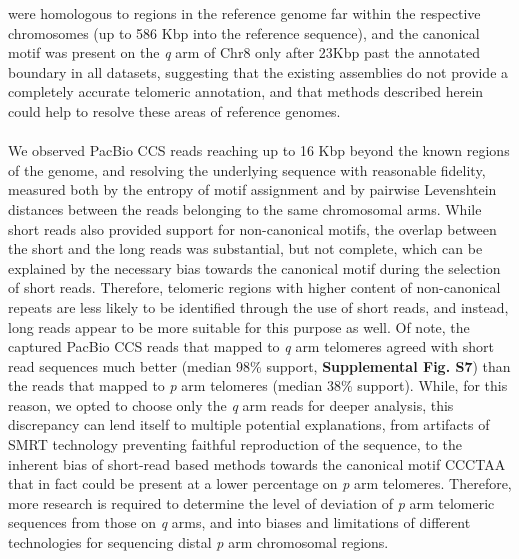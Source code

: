 \documentclass{article}
\begin{document}
        were homologous to regions in the reference genome far within the respective chromosomes (up to 586 Kbp into the reference sequence),
        and the canonical motif was present on the \textit{q} arm of Chr8
            only after 2\textendash{}3Kbp past the annotated boundary in all datasets,
        suggesting that the existing assemblies do not provide a completely accurate telomeric annotation,
        and that methods described herein could help to resolve these areas of reference genomes.
    \\~\\
    We observed PacBio CCS reads reaching up to 16 Kbp beyond the known regions of the genome,
        and resolving the underlying sequence with reasonable fidelity,
        measured both by the entropy of motif assignment and by pairwise Levenshtein distances
            between the reads belonging to the same chromosomal arms.
    While short reads also provided support for non-canonical motifs,
        the overlap between the short and the long reads was substantial, but not complete,
        which can be explained by the necessary bias towards the canonical motif during the selection of short reads.
    Therefore, telomeric regions with higher content of non-canonical repeats are less likely to be identified through the use of short reads,
        and instead, long reads appear to be more suitable for this purpose as well.
    Of note, the captured PacBio CCS reads that mapped to \textit{q} arm telomeres
        agreed with short read sequences much better (median 98\% support, \textbf{Supplemental Fig. S7})
        than the reads that mapped to \textit{p} arm telomeres (median 38\% support).
        While, for this reason, we opted to choose only the \textit{q} arm reads for deeper analysis,
            this discrepancy can lend itself to multiple potential explanations,
                from artifacts of SMRT technology preventing faithful reproduction of the sequence,
                to the inherent bias of short-read based methods \parencite{telomerecat} towards the canonical motif CCCTAA
                    that in fact could be present at a lower percentage on \textit{p} arm telomeres.
            Therefore, more research is required to determine the level of deviation of \textit{p} arm telomeric sequences
                from those on \textit{q} arms, and into biases and limitations of different technologies
                    for sequencing distal \textit{p} arm chromosomal regions.
    \\~\\
\end{document}
